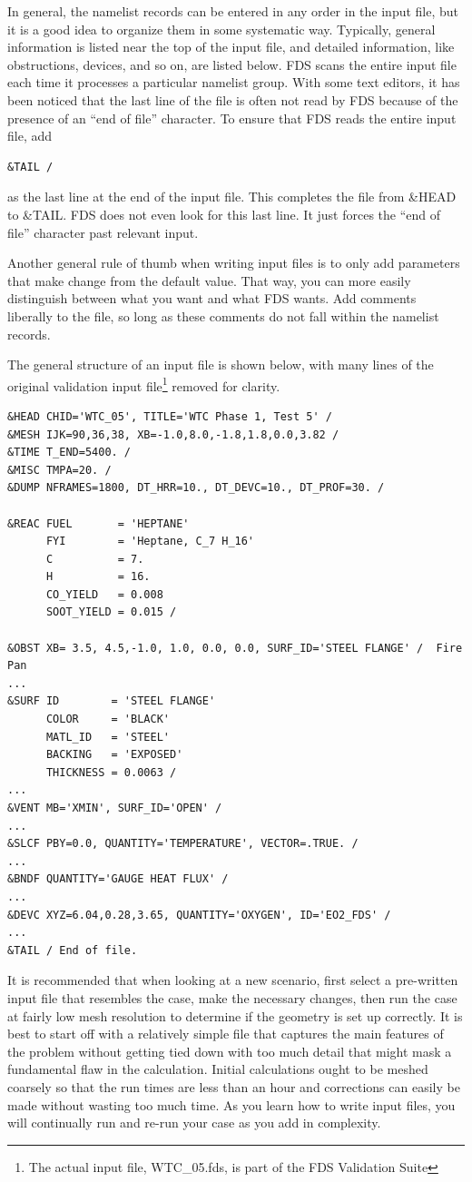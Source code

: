 \documentclass[11pt]{book}
\begin{document}
In general, the namelist records can be entered in any order in the input file, but it is a good idea to organize them
in some systematic way. Typically, general information is listed near the top of the input file, and detailed information, like
obstructions, devices, and so on, are listed below. FDS scans the entire input file each time it processes a particular namelist group.
With some text editors, it has been noticed that the last line of the file is often not read by FDS because of the presence of an
``end of file'' character.
To ensure that FDS reads the entire input file, add
\begin{lstlisting}
&TAIL /
\end{lstlisting}
as the last line at the end of the input file. This completes the file from {\ct \&HEAD} to {\ct \&TAIL}. FDS does not even look for
this last line. It just forces the ``end of file'' character past relevant input.

Another general rule of thumb when writing input files is to only add parameters that make change from the
default value. That way, you can more easily distinguish between what you want and what FDS wants.
Add comments liberally to the file, so long as
these comments do not fall within the namelist records.

The general structure of an input file is shown below, with many
lines of the original validation input file\footnote{The actual input file, WTC\_05.fds, is part of the FDS
Validation Suite} removed for clarity.

\begin{lstlisting}
&HEAD CHID='WTC_05', TITLE='WTC Phase 1, Test 5' /
&MESH IJK=90,36,38, XB=-1.0,8.0,-1.8,1.8,0.0,3.82 /
&TIME T_END=5400. /
&MISC TMPA=20. /
&DUMP NFRAMES=1800, DT_HRR=10., DT_DEVC=10., DT_PROF=30. /

&REAC FUEL       = 'HEPTANE'
      FYI        = 'Heptane, C_7 H_16'
      C          = 7.
      H          = 16.
      CO_YIELD   = 0.008
      SOOT_YIELD = 0.015 /

&OBST XB= 3.5, 4.5,-1.0, 1.0, 0.0, 0.0, SURF_ID='STEEL FLANGE' /  Fire Pan
...
&SURF ID        = 'STEEL FLANGE'
      COLOR     = 'BLACK'
      MATL_ID   = 'STEEL'
      BACKING   = 'EXPOSED'
      THICKNESS = 0.0063 /
...
&VENT MB='XMIN', SURF_ID='OPEN' /
...
&SLCF PBY=0.0, QUANTITY='TEMPERATURE', VECTOR=.TRUE. /
...
&BNDF QUANTITY='GAUGE HEAT FLUX' /
...
&DEVC XYZ=6.04,0.28,3.65, QUANTITY='OXYGEN', ID='EO2_FDS' /
...
&TAIL / End of file.
\end{lstlisting}
It is recommended that when looking at a new scenario,
first select a pre-written input file that resembles the case,
make the necessary changes, then run the case at fairly low
mesh resolution to determine if the geometry is set up correctly.
It is best to start off with a relatively simple file that captures the main
features of the problem without getting tied down with too much detail that
might mask a fundamental flaw in the calculation. Initial calculations ought
to be meshed coarsely so that the run times are less than an hour and
corrections can easily be made without wasting too much time.
As you learn how to write input files, you will continually
run and re-run your case as you add in complexity.
\end{document}
